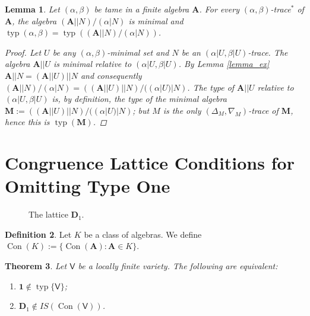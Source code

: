 \documentclass{amsart}
\theoremstyle{plain}
\newtheorem{theorem}{Theorem}[section]
\newtheorem{lemma}[theorem]{Lemma}
\theoremstyle{definition}
\newtheorem{definition}[theorem]{Definition}
\theoremstyle{remark}
\DeclareMathOperator{\Con}{Con}
\DeclareMathOperator{\typ}{typ}
\begin{document}
\begin{lemma}
    Let $(\alpha, \beta)$ be tame in a finite algebra $\mathbf{A}$.
    For every $(\alpha, \beta)$-trace$^*$ of $\mathbf{A}$, the algebra $(\mathbf{A}||N)/(\alpha|N)$ is minimal and $\typ(\alpha, \beta) = \typ((\mathbf{A}||N)/(\alpha|N))$. 
    \begin{proof}
        Let $U$ be any $(\alpha, \beta)$-minimal set and $N$ be an $(\alpha|U, \beta|U)$-trace. 
        The algebra $\mathbf{A}||U$ is minimal relative to $(\alpha|U, \beta|U)$. 
        By Lemma \ref{lemma_ex} $\mathbf{A}||N = (\mathbf{A}||U)||N$ and consequently $(\mathbf{A}||N)/(\alpha|N) = ((\mathbf{A}||U)||N)/((\alpha|U)|N)$. 
        The type of $\mathbf{A}||U$ relative to $(\alpha|U, \beta|U)$ is, by definition, the type of the minimal algebra $\mathbf{M}:= ((\mathbf{A}||U)||N)/((\alpha|U)|N)$; 
        but $M$ is the only $(\Delta_M, \nabla_M)$-trace of $\mathbf{M}$, hence this is $\typ(\mathbf{M})$.
    \end{proof}
\end{lemma}

\section{Congruence Lattice Conditions for Omitting Type One}

\begin{figure}
    \centering
    \caption{The lattice $\mathbf{D}_1$.}
    \end{figure}

\begin{definition}
    Let $K$ be a class of algebras.
    We define $\Con(K):=\{\Con(\mathbf{A}) : \mathbf{A} \in K\}$. 
\end{definition}

\begin{theorem}
    Let $\mathsf{V}$ be a locally finite variety.
    The following are equivalent: 
    \begin{enumerate}
        \item $\mathbf{1} \notin \typ\{\mathsf{V}\}$; 
        \item $\mathbf{D}_1 \notin IS(\Con(\mathsf{V}))$. 
    \end{enumerate}
\end{theorem}
\end{document}
